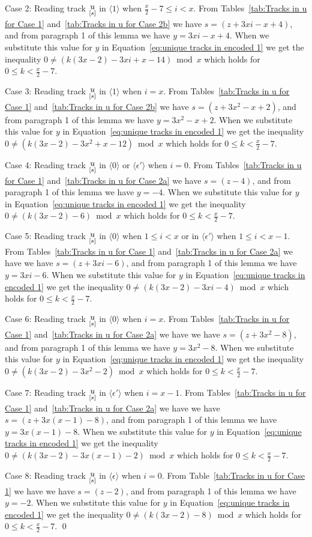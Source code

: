 \documentclass[11pt]{article} \usepackage{amsfonts,amsmath,amssymb,amsthm}
\renewenvironment{proof}{{\bfseries\noindent Proof.}}{\qed\vspace{3.5ex}}
\newcommand{\tne}[1]{\ensuremath{\langle #1\rangle}}
\newcommand{\encodeOne}{\tne{1}}
\newcommand{\encodeZero}{\tne{0}}
\newcommand{\encodeDeletion}{\tne{\epsilon}}
\newcommand{\encodeDeletionPrime}{\tne{\epsilon'}}
\newcommand{\track}[2]{\raisebox{2.5pt}{\ensuremath{\underset{[#1]}#2}}}
\begin{document}
\begin{proof}
Case 2: Reading track $\track{s}{u}$ in $\encodeOne$ when $\frac{x}{2}-7\leqslant i< x$. From Tables~\ref{tab:Tracks in u for Case 1} and~\ref{tab:Tracks in u for Case 2b} we have $s=(z+3xi-x+4)$, and from paragraph 1 of this lemma we have $y=3xi-x+4$. When we substitute this value for $y$ in Equation~\eqref{eq:unique tracks in encoded 1} we get the inequality $0\neq(k(3x-2)-3xi+x-14)\bmod x$ which holds for $0\leqslant k<\frac{x}{2}-7$.


Case 3: Reading track $\track{s}{u}$ in $\encodeOne$ when $i=x$. From Tables~\ref{tab:Tracks in u for Case 1} and~\ref{tab:Tracks in u for Case 2b} we have $s=(z+3x^{2}-x+2)$, and from paragraph 1 of this lemma we have $y=3x^{2}-x+2$.  When we substitute this value for $y$ in Equation~\eqref{eq:unique tracks in encoded 1} we get the inequality $0\neq(k(3x-2)-3x^2+x-12)\bmod x$ which holds for $0\leqslant k<\frac{x}{2}-7$.


Case 4: Reading track $\track{s}{u}$ in $\encodeZero$ or $\encodeDeletionPrime$ when $i=0$. From Tables~\ref{tab:Tracks in u for Case 1} and~\ref{tab:Tracks in u for Case 2a} we have $s=(z-4)$, and from paragraph 1 of this lemma we have $y=-4$. When we substitute this value for $y$ in Equation~\eqref{eq:unique tracks in encoded 1} we get the inequality $0\neq(k(3x-2)-6)\bmod x$ which holds for $0\leqslant k<\frac{x}{2}-7$.


Case 5: Reading track $\track{s}{u}$ in $\encodeZero$ when $1\leqslant i<x$ or in $\encodeDeletionPrime$ when $1\leqslant i<x-1$. From Tables~\ref{tab:Tracks in u for Case 1} and~\ref{tab:Tracks in u for Case 2a} we have we have $s=(z+3xi-6)$, and from paragraph 1 of this lemma we have $y=3xi-6$. When we substitute this value for $y$ in Equation~\eqref{eq:unique tracks in encoded 1} we get the inequality $0\neq(k(3x-2)-3xi-4)\bmod x$ which holds for $0\leqslant k<\frac{x}{2}-7$.


Case 6: Reading track $\track{s}{u}$ in $\encodeZero$ when $i=x$. From Tables~\ref{tab:Tracks in u for Case 1} and~\ref{tab:Tracks in u for Case 2a} we have we have $s=(z+3x^2-8)$, and from paragraph 1 of this lemma we have $y=3x^2-8$. When we substitute this value for $y$ in Equation~\eqref{eq:unique tracks in encoded 1} we get the inequality $0\neq(k(3x-2)-3x^2-2)\bmod x$ which holds for $0\leqslant k<\frac{x}{2}-7$.

Case 7: Reading track $\track{s}{u}$ in $\encodeDeletionPrime$ when $i=x-1$. From Tables~\ref{tab:Tracks in u for Case 1} and~\ref{tab:Tracks in u for Case 2a} we have we have $s=(z+3x(x-1)-8)$, and from paragraph 1 of this lemma we have $y=3x(x-1)-8$. When we substitute this value for $y$ in Equation~\eqref{eq:unique tracks in encoded 1} we get the inequality $0\neq(k(3x-2)-3x(x-1)-2)\bmod x$ which holds for $0\leqslant k<\frac{x}{2}-7$.


Case 8: Reading track $\track{s}{u}$ in $\encodeDeletion$ when $i=0$. From Table~\ref{tab:Tracks in u for Case 1} we have we have $s=(z-2)$, and from paragraph 1 of this lemma we have $y=-2$. When we substitute this value for $y$ in Equation~\eqref{eq:unique tracks in encoded 1} we get the inequality $0\neq(k(3x-2)-8)\bmod x$ which holds for $0\leqslant k<\frac{x}{2}-7$.
\end{proof}
\end{document}
